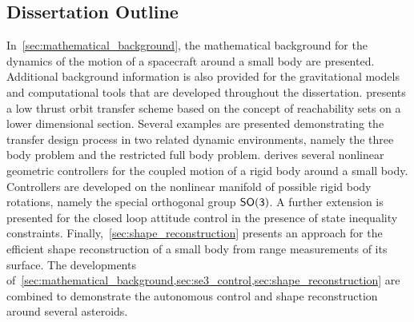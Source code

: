 \subsection{Dissertation Outline}

In~\cref{sec:mathematical_background}, the mathematical background for the dynamics of the motion of a spacecraft around a small body are presented. 
Additional background information is also provided for the gravitational models and computational tools that are developed throughout the dissertation.
 presents a low thrust orbit transfer scheme based on the concept of reachability sets on a lower dimensional \Poincare section.
Several examples are presented demonstrating the transfer design process in two related dynamic environments, namely the three body problem and the restricted full body problem.
 derives several nonlinear geometric controllers for the coupled motion of a rigid body around a small body.
Controllers are developed on the nonlinear manifold of possible rigid body rotations, namely the special orthogonal group \( \mathsf{SO(3)} \).
A further extension is presented for the closed loop attitude control in the presence of state inequality constraints.
Finally,~\cref{sec:shape_reconstruction} presents an approach for the efficient shape reconstruction of a small body from range measurements of its surface.
The developments of~\cref{sec:mathematical_background,sec:se3_control,sec:shape_reconstruction} are combined to demonstrate the autonomous control and shape reconstruction around several asteroids.




